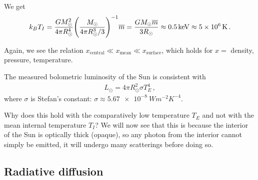 \documentclass[main.tex]{subfiles}
\begin{document}
We get 
%
\begin{align}
  k_B T_I
  =  \frac{G M_{\odot}^2}{4 \pi R_{\odot}^{4}}
   \qty( \frac{M_{\odot}}{4 \pi R_{\odot}^3 / 3})^{-1} \overline{m}
  = \frac{G M_{\odot} \overline{m}}{3 R_{\odot} } \approx \SI{.5}{keV} \approx \SI{5e6}{K}
\,.
\end{align}

Again, we see the relation \(x _{\text{central}} \ll x _{\text{mean}} \ll x _{\text{surface}}\), which holds for \(x = \) density, pressure, temperature. 

The measured bolometric luminosity of the Sun is consistent with 
%
\begin{align}
  L_{\odot} = 4 \pi R_{\odot}^2 \sigma T^{4}_{E}
\,,
\end{align}
%
where \(\sigma \) is Stefan's constant: \(\sigma \approx \SI{5.67e-8}{W m^{-2} K^{-4}}\). 

Why does this hold with the comparatively low temperature \(T_E\) and not with the mean internal temperature \(T_I\)?
We will now see that this is because the interior of the Sun is optically thick (opaque), so any photon from the interior cannot simply be emitted, it will undergo many scatterings before doing so. 


\subsection{Radiative diffusion}





\end{document}
